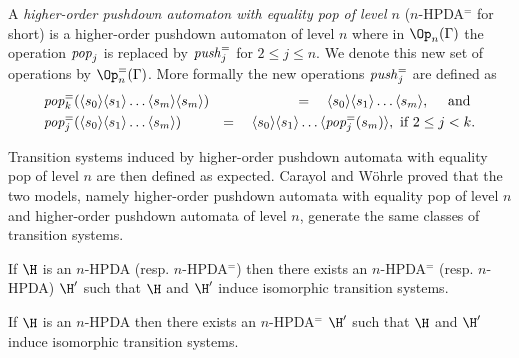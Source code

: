 A {\em higher-order pushdown automaton with equality pop of level $n$} ($n$-HPDA$^=$ for short) 
is a higher-order pushdown automaton of level $n$ where in
$\Op_n(\Gamma)$
 the operation 
 $\text{\textit{pop}}_j$  
  is replaced by 
$\text{\textit{push}}_j^=$
for $2 \leq j \leq n$.
We denote
this new set of operations by 
$\Op_n^=(\Gamma)$. 
More formally the new operations $\text{\textit{push}}_j^=$ are defined as
\begin{eqnarray*}
&\text{\textit{pop}}_k^=( \langle s_0 \rangle \langle s_1 \rangle \ldots  \langle s_m \rangle \langle s_m \rangle) &=\quad  \langle s_0 \rangle \langle s_1 \rangle \ldots \langle s_m \rangle , \quad \text{ and }\\
&\text{\textit{pop}}_j^=( \langle s_0 \rangle \langle s_1 \rangle \ldots \langle s_m \rangle) &=\quad \langle s_0 \rangle \langle s_1 \rangle \ldots 
\langle \text{\textit{pop}}_j^=(s_m) \rangle,
\text{ if } 2 \leq j < k. 
\end{eqnarray*}
%
%
%
%

%
Transition systems induced by higher-order pushdown automata with equality pop of level $n$
are then defined as expected.  
Carayol and W\"ohrle proved \cite{Woeh05, carayol2006automates} that the two models,
namely
higher-order pushdown automata with equality pop of level $n$
and
higher-order pushdown automata of level $n$,
generate the same classes of transition systems.





\begin{theorem}{\cite{Woeh05, carayol2006automates}}
If $\H$ is an $n$-HPDA (resp. $n$-HPDA$^=$) then there
exists an $n$-HPDA$^=$ (resp. $n$-HPDA) $\H'$ such that
$\H$ and $\H'$ %
induce isomorphic transition systems.
\end{theorem}

\iffalse
\begin{theorem}{\cite{Woeh05, carayol2006automates}}
If $\H$ is an $n$-HPDA  then there
exists an $n$-HPDA$^=$  $\H'$ such that
$\H$ and $\H'$ %
induce isomorphic transition systems.
\end{theorem}

